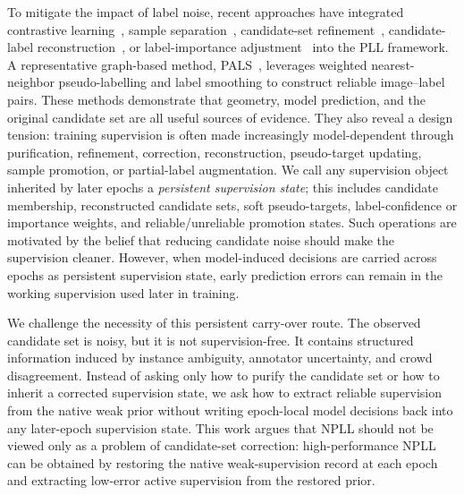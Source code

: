 To mitigate the impact of label noise, recent approaches have integrated contrastive learning~\cite{wang2022pico, wang2022pico+}, sample separation~\cite{lian2023irnet, Shi2023Unreliable}, candidate-set refinement~\cite{qiao2023fredis}, candidate-label reconstruction~\cite{peng2025noise}, or label-importance adjustment~\cite{xu2023alim} into the PLL framework. A representative graph-based method, PALS~\cite{pals2025}, leverages weighted nearest-neighbor pseudo-labelling and label smoothing to construct reliable image--label pairs. These methods demonstrate that geometry, model prediction, and the original candidate set are all useful sources of evidence. They also reveal a design tension: training supervision is often made increasingly model-dependent through purification, refinement, correction, reconstruction, pseudo-target updating, sample promotion, or partial-label augmentation. We call any supervision object inherited by later epochs a \emph{persistent supervision state}; this includes candidate membership, reconstructed candidate sets, soft pseudo-targets, label-confidence or importance weights, and reliable/unreliable promotion states. Such operations are motivated by the belief that reducing candidate noise should make the supervision cleaner. However, when model-induced decisions are carried across epochs as persistent supervision state, early prediction errors can remain in the working supervision used later in training.

We challenge the necessity of this persistent carry-over route. The observed candidate set is noisy, but it is not supervision-free. It contains structured information induced by instance ambiguity, annotator uncertainty, and crowd disagreement. Instead of asking only how to purify the candidate set or how to inherit a corrected supervision state, we ask how to extract reliable supervision from the native weak prior without writing epoch-local model decisions back into any later-epoch supervision state. This work argues that NPLL should not be viewed only as a problem of candidate-set correction: high-performance NPLL can be obtained by restoring the native weak-supervision record at each epoch and extracting low-error active supervision from the restored prior.

